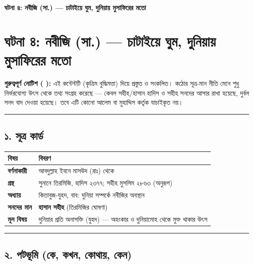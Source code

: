 

\begin{center}{\Large\bfseries\color{emerald} ঘটনা ৪: নবীজি (সা.) — চাটাইয়ে ঘুম, দুনিয়ায় মুসাফিরের মতো}\end{center}
\vspace{1em}
\section*{ঘটনা ৪: নবীজি (সা.) — চাটাইয়ে ঘুম, দুনিয়ায় মুসাফিরের মতো}

\begin{warnbox}
 \textbf{গুরুত্বপূর্ণ নোটিশ ( ):} এই কন্টেন্টটি  (কৃত্রিম বুদ্ধিমত্তা) দিয়ে প্রস্তুত ও সংকলিত।  কঠোর সূত্র-মান নীতি মেনে শুধু নির্ভরযোগ্য উৎস থেকে তথ্য সংগ্রহ করেছে — কেবল সহীহ/হাসান হাদিস ও সহীহ সনদের আসার রাখা হয়েছে, দুর্বল সনদ বাদ দেওয়া হয়েছে। তবে এটি কোনো আলেম বা মুহাদ্দিস কর্তৃক যাচাইকৃত নয়।
\end{warnbox}


\medskip\hrule\medskip

\subsection*{১. সূত্র কার্ড}

\begin{table}[h]\centering\small
\begin{tabular}{ll}
বিষয় & বিবরণ \\
\hline
\textbf{বর্ণনাকারী} & আবদুল্লাহ ইবনে মাসউদ (রাঃ) থেকে \\
\textbf{গ্রন্থ} & সুনানে তিরমিজি, হাদিস ২৩৭৭; সহীহ মুসলিম ২৮৬৩ (অনুরূপ) \\
\textbf{অধ্যায়} & কিতাবুজ-যুহদ, বাব: দুনিয়া সম্পর্কে নবীজির অবস্থান \\
\textbf{সনদের মান} & \textbf{হাসান সহীহ} (তিরমিজির ঘোষণা) \\
\textbf{মূল বিষয়} & দুনিয়ার প্রতি অনাসক্তি (যুহদ) — অহংকার ও দুনিয়ামোহ থেকে মুক্ত থাকার উৎস \\
\hline
\end{tabular}
\end{table}

\medskip\hrule\medskip

\subsection*{২. পটভূমি (কে, কখন, কোথায়, কেন)}

